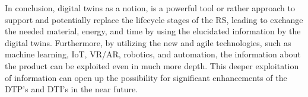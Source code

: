 \documentclass[conference]{IEEEtran}
\begin{document}
    
    In conclusion, digital twins as a notion, is a powerful tool or rather approach to support and potentially replace the lifecycle stages of the RS, 
    leading to exchange the needed material, energy, and time by using the elucidated information by the digital twins. Furthermore, 
    by utilizing the new and agile technologies, such as machine learning, IoT, VR/AR, robotics, and automation, the information about the product can be exploited even in much more depth. 
    This deeper exploitation of information can open up the possibility for significant enhancements of the DTP's and DTI's in the near future. 

    
    
    
\end{document}
